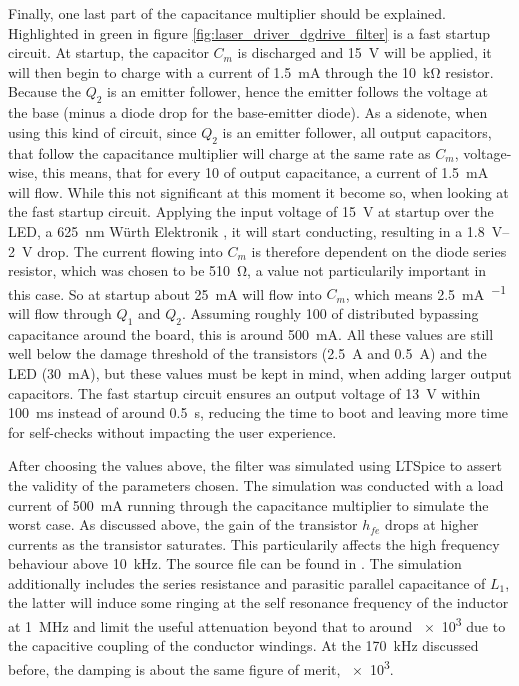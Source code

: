 Finally, one last part of the capacitance multiplier should be explained. Highlighted in green in figure \ref{fig:laser_driver_dgdrive_filter} is a fast startup circuit. At startup, the capacitor $C_m$ is discharged and \qty{15}{\V} will be applied, it will then begin to charge with a current of \qty{1.5}{\mA} through the \qty{10}{\kilo\ohm} resistor. Because the $Q_2$ is an emitter follower, hence the emitter follows the voltage at the base (minus a diode drop for the base-emitter diode). As a sidenote, when using this kind of circuit, since $Q_2$ is an emitter follower, all output capacitors, that follow the capacitance multiplier will charge at the same rate as $C_m$, voltage-wise, this means, that for every \qty{10}{\uF} of output capacitance, a current of \qty{1.5}{\mA} will flow. While this not significant at this moment it become so, when looking at the fast startup circuit. Applying the input voltage of \qty{15}{\V} at startup over the LED, a \qty{625}{\nm} Würth Elektronik , it will start conducting, resulting in a \qtyrange[range-units = single]{1.8}{2}{\V} drop. The current flowing into $C_m$ is therefore dependent on the diode series resistor, which was chosen to be \qty{510}{\ohm}, a value not particularily important in this case. So at startup about \qty{25}{\mA} will flow into $C_m$, which means \qty{2.5}{\mA \per \uF} will flow through $Q_1$ and $Q_2$. Assuming roughly \qty{100}{\uF} of distributed bypassing capacitance around the board, this is around \qty{500}{\mA}. All these values are still well below the damage threshold of the transistors (\qty{2.5}{\A} and \qty{0.5}{\A}) and the LED (\qty{30}{\mA}), but these values must be kept in mind, when adding larger output capacitors. The fast startup circuit ensures an output voltage of \qty{13}{\V} within \qty{100}{\ms} instead of around \qty{0.5}{\second}, reducing the time to boot and leaving more time for self-checks without impacting the user experience.

After choosing the values above, the filter was simulated using LTSpice to assert the validity of the parameters chosen. The simulation was conducted with a load current of \qty{500}{\mA} running through the capacitance multiplier to simulate the worst case. As discussed above, the gain of the transistor $h_{fe}$ drops at higher currents as the transistor saturates. This particularily affects the high frequency behaviour above \qty{10}{\kHz}. The source file can be found in . The simulation additionally includes the series resistance and parasitic parallel capacitance of $L_1$, the latter will induce some ringing at the self resonance frequency of the inductor at \qty{1}{\MHz} and limit the useful attenuation beyond that to around \num{e3} due to the capacitive coupling of the conductor windings. At the \qty{170}{\kHz} discussed before, the damping is about the same figure of merit, \num{e3}.

